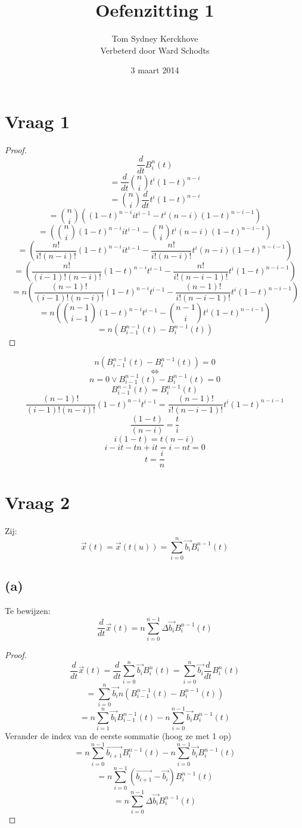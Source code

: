 \documentclass[10pt,a4paper]{article}
\title{Oefenzitting 1}
\author{Tom Sydney Kerckhove
		\\ Verbeterd door Ward Schodts}
\date{3 maart 2014}
\begin{document}
\maketitle

\section{Vraag 1}
\begin{proof}
\[
\frac{d}{dt}B^{n}_{i}(t)
\]
\[
= \frac{d}{dt}\binom{n}{i}t^i(1-t)^{n-i}
\]
\[
= \binom{n}{i}\frac{d}{dt}t^i(1-t)^{n-i}
\]
\[
= \binom{n}{i}
\left(
(1-t)^{n-i}it^{i-1} - t^i(n-i)(1-t)^{n-i-1}
\right)
\]
\[
=
\left(
\binom{n}{i}(1-t)^{n-i}it^{i-1} - \binom{n}{i}t^i(n-i)(1-t)^{n-i-1}
\right)
\]
\[
=
\left(
\frac{n!}{i!(n-i)!}(1-t)^{n-i}it^{i-1} - \frac{n!}{i!(n-i)!}t^i(n-i)(1-t)^{n-i-1}
\right)
\]
\[
=
\left(
\frac{n!}{(i-1)!(n-i)!}(1-t)^{n-i}t^{i-1} - \frac{n!}{i!(n-i-1)!}t^i(1-t)^{n-i-1}
\right)
\]
\[
=
n
\left(
\frac{(n-1)!}{(i-1)!(n-i)!}(1-t)^{n-i}t^{i-1} - \frac{(n-1)!}{i!(n-i-1)!}t^i(1-t)^{n-i-1}
\right)
\]
$$
=
n
\left(
\binom{n-1}{i-1}(1-t)^{n-i}t^{i-1} -
\binom{n-1}{i}t^i(1-t)^{n-i-1}
\right)
$$
\[
=
n
\left(
B^{n-1}_{i-1}(t) - B^{n-1}_{i}(t)
\right)
\]
\end{proof}
\[
n
\left(
B^{n-1}_{i-1}(t) - B^{n-1}_{i}(t)
\right)
=0
\]
\[
\Leftrightarrow
\] 
\[
n=0 \lor B^{n-1}_{i-1}(t) - B^{n-1}_{i}(t) = 0
\]
\[
B^{n-1}_{i-1}(t) = B^{n-1}_{i}(t)
\]
\[
\frac{(n-1)!}{(i-1)!(n-i)!}(1-t)^{n-i}t^{i-1} = \frac{(n-1)!}{i!(n-i-1)!}t^i(1-t)^{n-i-1}
\]
\[
\frac{(1-t)}{(n-i)} = \frac{t}{i}
\]
\[
i(1-t)=t(n-i) 
\]
\[
i-it-tn+it= i-nt =0
\]
\[
t = \frac{i}{n}
\]

\section{Vraag 2}
Zij:
\[
\vec{x}(t) = \vec{x}(t(u)) = \sum_{i=0}^{n}\vec{b_{i}}B_{i}^{n-1}(t)
\]
\subsection*{(a)}
Te bewijzen:
\[
\frac{d}{dt}\vec{x}(t) = n\sum_{i=0}^{n-1}\Delta\vec{b_i}B_{i}^{n-1}(t)
\]
\begin{proof}
\[
\frac{d}{dt}\vec{x}(t)
= \frac{d}{dt}\sum_{i=0}^{n}\vec{b_{i}}B_{i}^{n}(t)
= \sum_{i=0}^{n}\vec{b_{i}} \frac{d}{dt}B_{i}^{n}(t)
\]
\[
= \sum_{i=0}^{n}\vec{b_{i}}n
\left(
B^{n-1}_{i-1}(t) - B^{n-1}_{i}(t)
\right)
\]
\[
= n
\sum_{i=1}^{n}
\vec{b_{i}}B^{n-1}_{i-1}(t)
-n 
\sum_{i=0}^{n-1}
\vec{b_{i}}B^{n-1}_{i}(t)
\]
Verander de index van de eerste sommatie (hoog ze met 1 op)
\[
= n
\sum_{i=0}^{n-1}
\vec{b_{i+1}}B^{n-1}_{i}(t)
-n 
\sum_{i=0}^{n-1}
\vec{b_{i}}B^{n-1}_{i}(t)
\]
\[
= n
\sum_{i=0}^{n-1}
(\vec{b_{i+1}}-\vec{b_{i}})B^{n-1}_{i}(t)
\]
\[
= n
\sum_{i=0}^{n-1}\Delta\vec{b_{i}}B^{n-1}_{i}(t)
\]
\end{proof}
\end{document}
